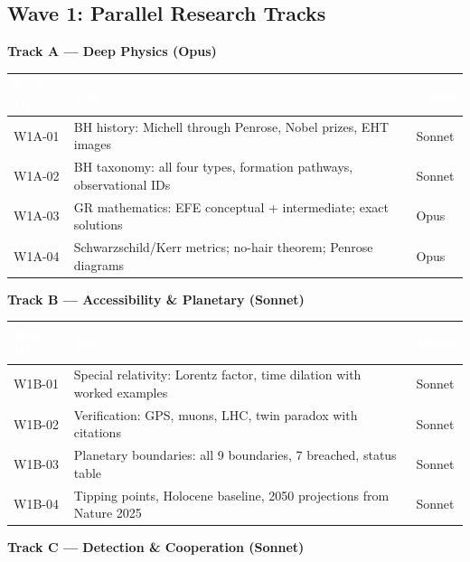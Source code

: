 \documentclass[11pt,letterpaper]{article}
\newcommand{\tableheader}[1]{\textbf{\sffamily\textcolor{white}{#1}}}
\begin{document}
\subsection{Wave 1: Parallel Research Tracks}

\textbf{Track A --- Deep Physics (Opus)}

\begin{center}
\begin{tabularx}{\textwidth}{L{2.5cm}XC{2cm}}
\toprule
{}
\tableheader{Task ID} & \tableheader{Task} & \tableheader{Model} \\
\midrule
W1A-01 & BH history: Michell through Penrose, Nobel prizes, EHT images & Sonnet \\
W1A-02 & BH taxonomy: all four types, formation pathways, observational IDs & Sonnet \\
W1A-03 & GR mathematics: EFE conceptual + intermediate; exact solutions & Opus \\
W1A-04 & Schwarzschild/Kerr metrics; no-hair theorem; Penrose diagrams & Opus \\
\bottomrule
\end{tabularx}
\end{center}

\textbf{Track B --- Accessibility \& Planetary (Sonnet)}

\begin{center}
\begin{tabularx}{\textwidth}{L{2.5cm}XC{2cm}}
\toprule
{}
\tableheader{Task ID} & \tableheader{Task} & \tableheader{Model} \\
\midrule
W1B-01 & Special relativity: Lorentz factor, time dilation with worked examples & Sonnet \\
W1B-02 & Verification: GPS, muons, LHC, twin paradox with citations & Sonnet \\
W1B-03 & Planetary boundaries: all 9 boundaries, 7 breached, status table & Sonnet \\
W1B-04 & Tipping points, Holocene baseline, 2050 projections from Nature 2025 & Sonnet \\
\bottomrule
\end{tabularx}
\end{center}

\textbf{Track C --- Detection \& Cooperation (Sonnet)}
\end{document}
